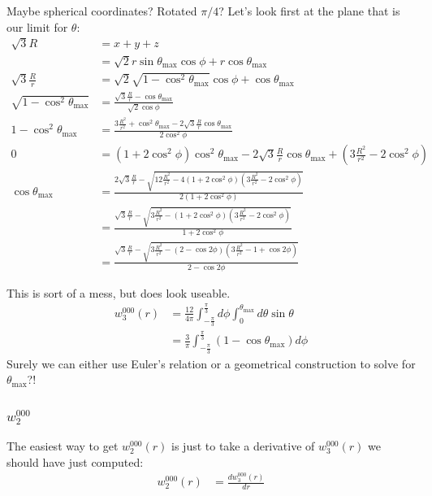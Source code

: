 \documentclass[letterpaper,twocolumn,amsmath,amssymb,pre]{revtex4-1}
\begin{document}
\newcommand\thetamax{\theta_{\text{max}}}
\begin{widetext}
Maybe spherical coordinates? Rotated $\pi/4$? Let's look first at the
plane that is our limit for $\theta$:
\begin{align}
  \sqrt{3}R &= x + y + z \\
  &= \sqrt{2}r\sin\thetamax\cos\phi +
  r\cos\thetamax
  \\
  \sqrt{3}\frac{R}{r} &=
  \sqrt{2}\sqrt{1-\cos^2\thetamax}\cos\phi
  + \cos\thetamax
  \\
  \sqrt{1-\cos^2\thetamax} &=
  \frac{\sqrt{3}\frac{R}{r}-\cos\thetamax}{\sqrt{2}\cos\phi}
  \\
  1-\cos^2\thetamax &=
  \frac{3\frac{R^2}{r^2}+\cos^2\thetamax -
    2\sqrt{3}\frac{R}{r}\cos\thetamax}{2\cos^2\phi}
  \\
  0 &=
  (1+2\cos^2\phi)\cos^2\thetamax
  - 2\sqrt{3}\frac{R}{r}\cos\thetamax
  + \left(3\frac{R^2}{r^2} - 2\cos^2\phi\right)
  \\
  \cos\thetamax &= \frac{2\sqrt{3}\frac{R}{r}
  - \sqrt{12\frac{R^2}{r^2} - 4(1+2\cos^2\phi)\left(3\frac{R^2}{r^2}-2\cos^2\phi\right)}}{2(1+2\cos^2\phi)}
  \\
  &= \frac{\sqrt{3}\frac{R}{r}
  - \sqrt{3\frac{R^2}{r^2} - (1+2\cos^2\phi)\left(3\frac{R^2}{r^2}-2\cos^2\phi\right)}}{1+2\cos^2\phi}
  \\
  &= \frac{\sqrt{3}\frac{R}{r}
  - \sqrt{3\frac{R^2}{r^2} - (2-\cos2\phi)\left(3\frac{R^2}{r^2}-1+\cos2\phi\right)}}{2-\cos2\phi}
\end{align}
\end{widetext}
This is sort of a mess, but does look useable.
\begin{align}
  w_3^{000}(r) &=
  \frac{12}{4\pi}
  \int_{-\frac{\pi}{3}}^{\frac{\pi}{3}}d\phi
  \int_0^{\thetamax}d\theta
  \sin\theta
  \\
  &=
  \frac{3}{\pi}
  \int_{-\frac{\pi}{3}}^{\frac{\pi}{3}}
  (1 - \cos\thetamax)d\phi
\end{align}
Surely we can either use Euler's relation or a geometrical
construction to solve for $\thetamax$?!

\subsubsection{$w_2^{000}$}
The easiest way to get $w_2^{000}(r)$ is just to take a derivative of
$w_3^{000}(r)$ we should have just computed:
\begin{align}
  w_2^{000}(r) &= \frac{dw_3^{000}(r)}{dr}
\end{align}
\end{document}
